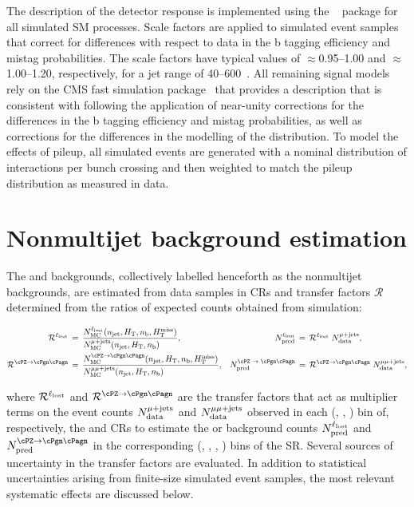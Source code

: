 The description of the detector response is implemented using the
\GEANTfour~\cite{geant} package for all simulated SM processes. Scale
factors are applied to simulated event samples that correct for
differences with respect to data in the b tagging efficiency and
mistag probabilities. The scale factors have typical values of
${\approx}$0.95--1.00 and ${\approx}$1.00--1.20, respectively, for a
jet \pt range of 40--600\GeV~\cite{BTV-16-002}. All remaining signal
models rely on the CMS fast simulation package~\cite{fastsim} that
provides a description that is consistent with \GEANTfour following
the application of near-unity corrections for the differences in the b
tagging efficiency and mistag probabilities, as well as corrections
for the differences in the modelling of the \mht distribution. To
model the effects of pileup, all simulated events are generated with a
nominal distribution of {\Pp\Pp} interactions per bunch crossing and then
weighted to match the pileup distribution as measured in data.

\section{Nonmultijet background estimation}
\label{sec:ewk}

The \lost and \znunuj backgrounds, collectively labelled henceforth as
the nonmultijet backgrounds, are estimated from data samples in CRs
and transfer factors $\mathcal{R}$ determined from the ratios of
expected counts obtained from simulation:

\begin{align}
  \tf^{\lost} \, & = \,
  \frac{N^{\lost}_\text{MC}(\njet, \scalht, \nb, \mht)}
  {N^{\mj}_\text{MC}(\njet, \scalht, \nb)\hfill},
  & 
  N^{\lost}_\text{pred} \, & = \,
  \tf^{\lost} \; N^{\mj}_\text{data},
  \\
  \tf^{\znunu} \, & = \,
  \frac{N^{\znunu}_\text{MC}(\njet, \scalht, \nb, \mht)}
  {N^{\mmj}_\text{MC}(\njet, \scalht, \nb)\hfill},
  & 
  N^\text{\znunu}_\text{pred} \, & = \,
  \tf^{\znunu} \; N^{\mmj}_\text{data},
\end{align}

where $\mathcal{R}^{\ell_\text{lost}}$ and $\tf^{\znunu}$ are the transfer factors that
act as multiplier terms on the event counts $N^{\mu\text{+\ensuremath{\text{jets}}}}_\text{data}$ and
$N^{\mu\mu\text{+\ensuremath{\text{jets}}}}_\text{data}$ observed in each (\njet, \scalht, \nb) bin of,
respectively, the \mj and \mmj CRs to estimate the \lost or \znunuj
background counts $N^{\ell_\text{lost}}_\text{pred}$ and $N^{\znunu}_\text{pred}$
in the corresponding (\njet, \scalht, \nb, \mht) bins of the
SR. Several sources of uncertainty in the transfer factors are
evaluated.  In addition to statistical uncertainties arising from
finite-size simulated event samples, the most relevant systematic
effects are discussed below.

